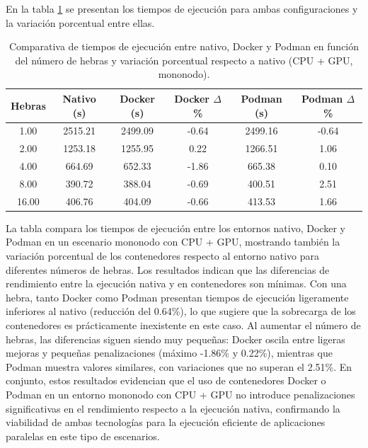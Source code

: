 En la tabla \ref{tab:single-node_ubuntu_container_vs_native_gpu} se presentan los tiempos de ejecución para ambas configuraciones y la variación porcentual entre ellas.

\begin{table}[ht]
    \centering
    \small
    \setlength{\tabcolsep}{4pt}
    \renewcommand{\arraystretch}{1.1}
    \begin{tabular}{|c|c|c|c|c|c|}
        \hline
        \textbf{Hebras} & \textbf{Nativo (s)} & \textbf{Docker (s)} & \textbf{Docker $\Delta$\%} & \textbf{Podman (s)} & \textbf{Podman $\Delta$\%} \\
        \hline
        1.00            & 2515.21             & 2499.09             & -0.64                      & 2499.16             & -0.64                      \\
        2.00            & 1253.18             & 1255.95             & 0.22                       & 1266.51             & 1.06                       \\
        4.00            & 664.69              & 652.33              & -1.86                      & 665.38              & 0.10                       \\
        8.00            & 390.72              & 388.04              & -0.69                      & 400.51              & 2.51                       \\
        16.00           & 406.76              & 404.09              & -0.66                      & 413.53              & 1.66                       \\
        \hline
    \end{tabular}
    \caption{Comparativa de tiempos de ejecución entre nativo, Docker y Podman en función del número de hebras y variación porcentual respecto a nativo (CPU + GPU, mononodo).}
    \label{tab:single-node_ubuntu_container_vs_native_gpu}
\end{table}

La tabla compara los tiempos de ejecución entre los entornos nativo, Docker y Podman en un escenario mononodo con CPU + GPU, mostrando también la variación porcentual de los contenedores respecto al entorno nativo para diferentes números de hebras. Los resultados indican que las diferencias de rendimiento entre la ejecución nativa y en contenedores son mínimas. Con una hebra, tanto Docker como Podman presentan tiempos de ejecución ligeramente inferiores al nativo (reducción del 0.64\%), lo que sugiere que la sobrecarga de los contenedores es prácticamente inexistente en este caso. Al aumentar el número de hebras, las diferencias siguen siendo muy pequeñas: Docker oscila entre ligeras mejoras y pequeñas penalizaciones (máximo -1.86\% y 0.22\%), mientras que Podman muestra valores similares, con variaciones que no superan el 2.51\%. En conjunto, estos resultados evidencian que el uso de contenedores Docker o Podman en un entorno mononodo con CPU + GPU no introduce penalizaciones significativas en el rendimiento respecto a la ejecución nativa, confirmando la viabilidad de ambas tecnologías para la ejecución eficiente de aplicaciones paralelas en este tipo de escenarios.

